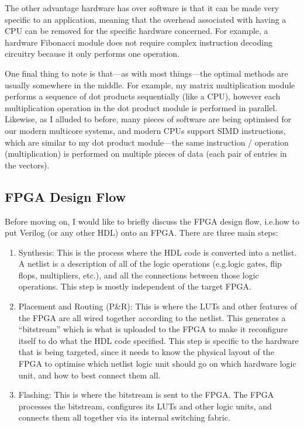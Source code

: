 \documentclass[12pt]{article}
\begin{document}
The other advantage hardware has over software is that it can be made very specific to an application, meaning that the overhead associated with having a CPU can be removed for the specific hardware concerned. For example, a hardware Fibonacci module does not require complex instruction decoding circuitry because it only performs one operation.

One final thing to note is that---as with most things---the optimal methods are usually somewhere in the middle. For example, my matrix multiplication module performs a sequence of dot products sequentially (like a CPU), however each multiplication operation in the dot product module is performed in parallel. Likewise, as I alluded to before, many pieces of software are being optimised for our modern multicore systems, and modern CPUs support SIMD instructions, which are similar to my dot product module---the same instruction / operation (multiplication) is performed on multiple pieces of data (each pair of entries in the vectors).

\subsection{FPGA Design Flow}

Before moving on, I would like to briefly discuss the FPGA design flow, i.e.\@ how to put Verilog (or any other HDL) onto an FPGA. There are three main steps:

\begin{enumerate}
	\item Synthesis: This is the process where the HDL code is converted into a netlist. A netlist is a description of all of the logic operations (e.g.\@ logic gates, flip flops, multipliers, etc.\@), and all the connections between those logic operations. This step is mostly independent of the target FPGA.
	\item Placement and Routing (P\&R): This is where the LUTs and other features of the FPGA are all wired together according to the netlist. This generates a ``bitstream'' which is what is uploaded to the FPGA to make it reconfigure itself to do what the HDL code specified. This step is specific to the hardware that is being targeted, since it needs to know the physical layout of the FPGA to optimise which netlist logic unit should go on which hardware logic unit, and how to best connect them all.
	\item Flashing: This is where the bitstream is sent to the FPGA. The FPGA processes the bitstream, configures its LUTs and other logic units, and connects them all together via its internal switching fabric.
\end{enumerate}
\end{document}
